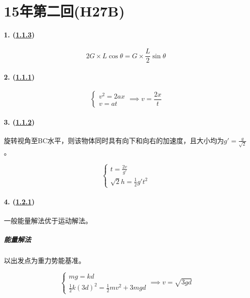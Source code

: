 
\section{15年第二回(H27B)}

\paragraph{1. (\hyperref[subsec:1.1.3]{1.1.3})}

\begin{equation*}
    2G\times L\cos\theta=G\times\frac{L}{2}\sin\theta
\end{equation*}

\paragraph{2. (\hyperref[subsec:1.1.1]{1.1.1})}

\begin{equation*}
    \begin{cases}
        v^2=2ax\\
        v=at
    \end{cases}\implies
    v=\frac{2x}{t}
\end{equation*}

\paragraph{3. (\hyperref[subsec:1.1.2]{1.1.2})} 旋转视角至BC水平，则该物体同时具有向下和向右的加速度，且大小均为$g'=\frac{g}{\sqrt{2}}$。

\begin{equation*}
    \begin{cases}
        t=\frac{2v}{g'}\\
        \sqrt{2}h=\frac12g't^2
    \end{cases}
\end{equation*}

\paragraph{4. (\hyperref[subsec:1.2.1]{1.2.1})} 一般能量解法优于运动解法。

\subparagraph{能量解法} 以出发点为重力势能基准。

\begin{equation*}
    \begin{cases}
        mg=kd\\
        \frac12k(3d)^2=\frac12mv^2+3mgd
    \end{cases}\implies
    v=\sqrt{3gd}
\end{equation*}

